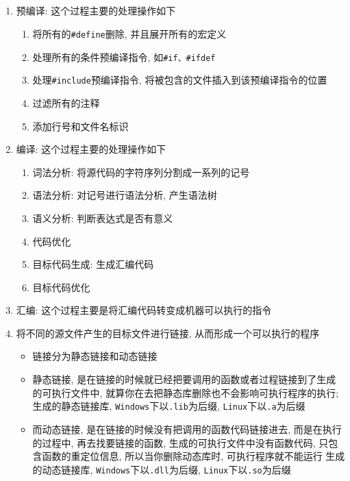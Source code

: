 \subsection{}
\begin{enumerate}
	\item 预编译: 这个过程主要的处理操作如下
	\begin{enumerate}
		\item 将所有的{\tt \#define}删除, 并且展开所有的宏定义
		\item 处理所有的条件预编译指令, 如{\tt \#if、\#ifdef}
		\item 处理{\tt \#include}预编译指令, 将被包含的文件插入到该预编译指令的位置
		\item 过滤所有的注释
		\item 添加行号和文件名标识
	\end{enumerate}
	\item 编译: 这个过程主要的处理操作如下
	\begin{enumerate}
		\item 词法分析: 将源代码的字符序列分割成一系列的记号
		\item 语法分析: 对记号进行语法分析, 产生语法树
		\item 语义分析: 判断表达式是否有意义
		\item 代码优化
		\item 目标代码生成: 生成汇编代码
		\item 目标代码优化
	\end{enumerate}
	\item 汇编: 这个过程主要是将汇编代码转变成机器可以执行的指令
	\item 将不同的源文件产生的目标文件进行链接, 从而形成一个可以执行的程序
	\begin{itemize}
		\item 链接分为静态链接和动态链接
		\item 静态链接, 是在链接的时候就已经把要调用的函数或者过程链接到了生成的可执行文件中, 
				就算你在去把静态库删除也不会影响可执行程序的执行; 生成的静态链接库, {\tt Windows}下以{\tt .lib}为后缀, 
				{\tt Linux}下以{\tt .a}为后缀
		\item 而动态链接, 是在链接的时候没有把调用的函数代码链接进去, 而是在执行的过程中, 再去找要链接的函数, 
				生成的可执行文件中没有函数代码, 只包含函数的重定位信息, 所以当你删除动态库时, 可执行程序就不能运行
				生成的动态链接库, {\tt Windows}下以{\tt .dll}为后缀, {\tt Linux}下以{\tt .so}为后缀
	\end{itemize}
\end{enumerate}
